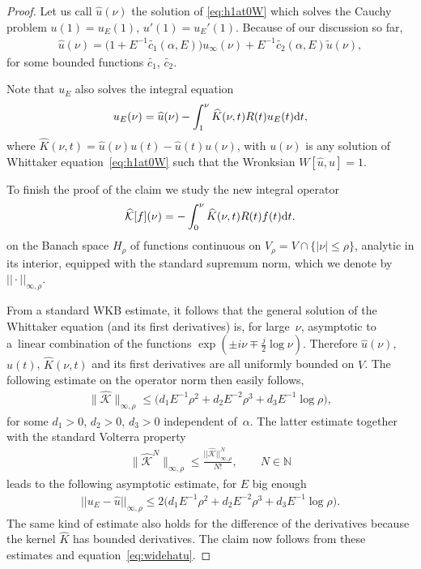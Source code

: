 \documentclass[pdftex]{sigma}
\numberwithin{equation}{section}
\newcommand{\bb}[1]{\mathbb{ #1 }}
\newcommand{\al}{\alpha}
\begin{document}
\begin{proof}
Let us call $\widehat{u}(\nu)$ the solution of \eqref{eq:h1at0W} which solves the Cauchy problem $u(1)=u_E(1)$, $u'(1)=u_E'(1)$. Because of our discussion so far,
	\begin{gather}\label{eq:widehatu}
	\widehat{u}(\nu)=\big(1+E^{-1}\tilde{c_1}(\al,E) \big)u_{\infty}(\nu)+E^{-1}\tilde{c_2}(\al,E) \tilde{u}(\nu),
	\end{gather}
	for some bounded functions $\tilde{c_1}$, $\tilde{c_2}$.
	
	Note that $u_E$ also solves the integral equation
	\begin{gather*}%
	u_E(\nu)=\widehat{u}(\nu)-\int_1^{\nu}\widehat{K}(\nu,t)R(t)u_E(t) {\rm d}t ,
	\end{gather*}
where $\widehat{K}(\nu,t)=\widehat{u}(\nu) u(t)-\widehat{u}(t)u(\nu)$, with $u(\nu)$ is any solution of Whittaker equation~\eqref{eq:h1at0W} such that the Wronksian $W[\widehat{u},u]=1$.
	
	To f\/inish the proof of the claim we study the new integral operator
	\begin{gather*}
	\widehat{{\mathcal{K}}}[f](\nu)=-\int_{0}^\nu \widehat{ K}(\nu,t) R(t) f(t){\rm d}t.
	\end{gather*}
on the Banach space $H_{\rho}$ of functions continuous on $V_\rho=V \cap \lbrace |\nu| \leq \rho \rbrace$, analytic in its interior, equipped with the standard supremum norm, which we denote by $||\cdot||_{\infty,\rho}$.
	
From a standard WKB estimate, it follows that the general solution of the Whittaker equation (and its f\/irst derivatives) is, for large~$\nu$, asymptotic to a~linear combination of the functions $\exp(\pm i \nu \mp \frac{j}{2} \log \nu)$. Therefore $\widehat{u}(\nu)$, $ u(t)$, $\widehat{K}(\nu,t)$ and its f\/irst derivatives are all uniformly bounded on $V$. The following estimate on the operator norm then easily follows,
	\begin{gather*}
	\big\|\widehat{\mathcal{K}}\big\|_{\infty,\rho}\leq\big(d_1 E^{-1} \rho^2 + d_2 E^{-2} \rho^3 + d_3 E^{-1} \log{\rho}\big),
	\end{gather*}
	for some $ d_1>0$, $d_2>0$, $d_3>0$ independent of~$\al$. The latter estimate together with the standard Volterra property
	\begin{gather*}
	\big\|\widehat{\mathcal{K}}^N\big\|_{\infty,\rho}\leq \frac{||\widehat{\mathcal{K}}||^N_{\infty,\rho}}{N!} , \qquad N \in \bb{N}
	\end{gather*}
	leads to the following asymptotic estimate, for $E$ big enough
	\begin{gather*}
	||u_E-\widehat{u}||_{\infty,\rho}\leq 2 \big(d_1 E^{-1} \rho^2 + d_2 E^{-2} \rho^3 + d_3 E^{-1} \log{\rho}\big).
	\end{gather*}
	The same kind of estimate also holds for the dif\/ference of the derivatives because the kernel $\widehat{K}$ has bounded derivatives. The claim now follows from these estimates and equation~\eqref{eq:widehatu}.
	

\end{proof}
\end{document}
